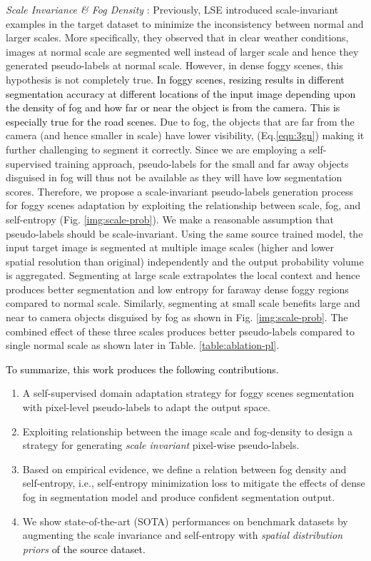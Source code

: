 \documentclass[final,5p,times,twocolumn]{elsarticle}
\begin{document}
\textit{Scale Invariance \& Fog Density} :
Previously, LSE \cite{LSE_2020_Naseer} introduced scale-invariant examples in the target dataset to minimize the inconsistency between normal and larger scales. More specifically, they observed that in clear weather conditions, images at normal scale are segmented well instead of larger scale and hence they generated pseudo-labels at normal scale. However, in dense foggy scenes, this hypothesis is not completely true. \textcolor{black}{In foggy scenes, resizing results in different segmentation accuracy at different locations of the input image depending upon the density of fog and how far or near the object is from the camera.}
\textcolor{black}{This is especially true for the road scenes.}
Due to fog,  the objects that are far from the camera (and hence smaller in scale) have lower visibility, (Eq.\ref{eqn:3gn}) making it further challenging to segment it correctly. 
Since we are employing a self-supervised training approach, pseudo-labels for the small and far away objects disguised in fog will thus not be available as they will have low segmentation scores. 
Therefore, we propose a scale-invariant pseudo-labels generation process for foggy scenes adaptation by exploiting the relationship between scale, fog, and self-entropy (Fig. \ref{img:scale-prob}). 
We make a reasonable assumption that pseudo-labels should be scale-invariant.
Using the same source trained model, the input target image is segmented at multiple image scales (higher and lower spatial resolution than original) independently and the output probability volume is aggregated. 
Segmenting at large scale extrapolates the local context and hence produces better segmentation and low entropy for faraway dense foggy regions compared to normal scale. Similarly, segmenting at small scale benefits large and near to camera objects disguised by fog as shown in Fig. \ref{img:scale-prob}.
The combined effect of these three scales produces better pseudo-labels compared to single normal scale as shown later in Table. \ref{table:ablation-pl}. 


\noindent \textcolor{black}{To summarize, this work produces the following contributions.} 
\begin{enumerate}
\item A self-supervised domain adaptation strategy for foggy scenes segmentation with pixel-level pseudo-labels to adapt the output space. 
\item Exploiting relationship between the image scale and fog-density to design a strategy for generating \textit{scale invariant} pixel-wise pseudo-labels.
\item Based on empirical evidence, we define a relation between fog density and self-entropy, i.e., self-entropy minimization loss to  mitigate the effects of dense fog in segmentation model and produce confident segmentation output.
\item We show state-of-the-art (SOTA) performances on benchmark datasets by augmenting the scale invariance and self-entropy with \textit{spatial distribution priors} \textcolor{black}{of the source dataset.}
\end{enumerate}
\end{document}
